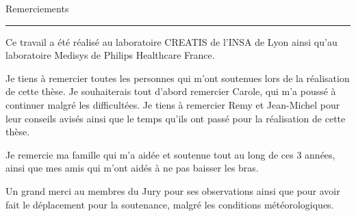 {\fontsize{30}{100}\selectfont Remerciements}

\rule{15cm}{0.1em}

\vspace{1cm}

\thispagestyle{plain}

Ce travail a été réalisé au laboratoire CREATIS de l'INSA de Lyon ainsi qu'au laboratoire Medisys de Philips Healthcare France.

Je tiens à remercier toutes les personnes qui m'ont soutenues lors de la réalisation de cette thèse. Je souhaiterais tout d'abord remercier Carole, qui m'a poussé à continuer malgré les difficultées. Je tiens à remercier Remy et Jean-Michel pour leur conseils avisés ainsi que le temps qu'ils ont passé pour la réalisation de cette thèse. 

Je remercie ma famille qui m'a aidée et soutenue tout au long de ces 3 années, ainsi que mes amis qui m'ont aidés à ne pas baisser les bras.

Un grand merci au membres du Jury pour ses observations ainsi que pour avoir fait le déplacement pour la soutenance, malgré les conditions météorologiques.

